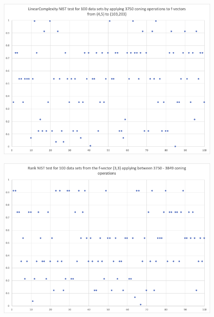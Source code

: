 \documentclass[oneside,12pt]{amsart}
\theoremstyle{definition}
\numberwithin{equation}{section}
\begin{document}
\begin{figure}[h!]
\centering
\includegraphics[scale=.5]{./charts/LinearComplexity_4_5.png}
\label{fig:linear45}
\end{figure}

\begin{figure}[h!]
\centering
\includegraphics[scale=.5]{./charts/Rank_3_3.png}
\label{fig:rank33}
\end{figure}
\end{document}
